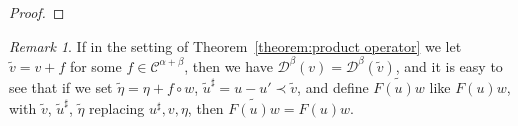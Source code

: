 \documentclass[11pt,a4paper]{article}
\theoremstyle{remark}
\newtheorem{remark}[theorem]{Remark}
\newcommand{\CC}{\ensuremath{\mathscr{C}}}
\newcommand{\CD}{\ensuremath{\mathscr{D}}}
\begin{document}
\begin{proof}
\end{proof}

\begin{remark}\label{rmk:product smooth perturbation}
   If in the setting of Theorem~\ref{theorem:product operator} we let $\tilde v = v + f$ for some $f \in \CC^{\alpha+\beta}$, then we have $\CD^\beta(v) = \CD^\beta(\tilde v)$, and it is easy to see that if we set $\tilde \eta = \eta + f \circ w$, $\tilde u^\sharp = u - u'\prec \tilde v$, and define $\widetilde{F(u)w}$ like $F(u)w$, with $\tilde v$, $\tilde u^\sharp$, $\tilde \eta$ replacing $u^\sharp, v, \eta$, then $\widetilde{F(u)w} = F(u)w$.
\end{remark}
\end{document}
